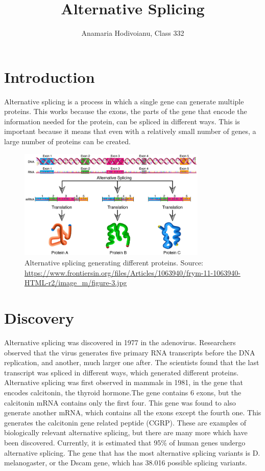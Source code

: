 \documentclass[twocolumn]{article}
\title{Alternative Splicing}
\author{Anamaria Hodivoianu, Class 332}
\begin{document}
\maketitle

\section{Introduction}
Alternative splicing is a process in which a single gene can generate multiple proteins. This works because the exons, the parts of the gene that encode the information needed for the protein, can be spliced in different ways. This is important because it means that even with a relatively small number of genes, a large number of proteins can be created.

\begin{figure}
    \centering
    \includegraphics[width=0.8\textwidth]{figure-3.jpg}
    \caption{Alternative splicing generating different proteins. Source: \url{https://www.frontiersin.org/files/Articles/1063940/frym-11-1063940-HTML-r2/image_m/figure-3.jpg}}
\end{figure}

\section{Discovery}
Alternative splicing was discovered in 1977 in the adenovirus. Researchers observed that the virus generates five primary RNA transcripts before the DNA replication, and another, much larger one after. The scientists found that the last transcript was spliced in different ways, which generated different proteins. 
Alternative splicing was first observed in mammals in 1981, in the gene that encodes calcitonin, the thyroid hormone.The gene contains 6 exons, but the calcitonin mRNA contains only the first four. This gene was found to also generate another mRNA, which contains all the exons except the fourth one. This generates the calcitonin gene related peptide (CGRP).
These are examples of biologically relevant alternative splicing, but there are many more which have been discovered. Currently, it is estimated that 95\% of human genes undergo alternative splicing. The gene that has the most alternative splicing variants is D. melanogaster, or the Dscam gene, which has 38.016 possible splicing variants.
\end{document}
